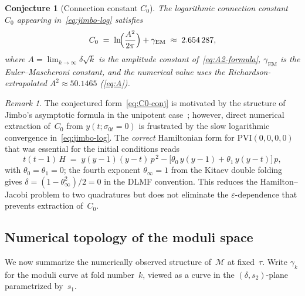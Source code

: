 \documentclass[11pt,a4paper]{article}
\theoremstyle{plain}
\newtheorem{conjecture}[theorem]{Conjecture}
\theoremstyle{definition}
\theoremstyle{remark}
\newtheorem{remark}[theorem]{Remark}
\begin{document}
\begin{conjecture}[Connection constant $C_0$]
\label{conj:C0}
The logarithmic connection constant~$C_0$ appearing
in~\eqref{eq:jimbo-log} satisfies
\begin{equation}\label{eq:C0-conj}
  C_0 \;=\; \ln\!\Bigl(\frac{A^2}{2\pi}\Bigr) + \gamma_{\mathrm{EM}}
  \;\approx\; 2.654\,287,
\end{equation}
where $A = \lim_{k\to\infty}\delta\sqrt{k}$ is the amplitude
constant of~\cref{eq:A2-formula},
$\gamma_{\mathrm{EM}}$ is the Euler--Mascheroni constant,
and the numerical value uses the Richardson-extrapolated
$A^2 \approx 50.1465$ (\cref{eq:A}).
\end{conjecture}

\begin{remark}
The conjectured form~\eqref{eq:C0-conj} is motivated by the
structure of Jimbo's asymptotic formula in the unipotent
case~\cite{Jim82}; however, direct numerical extraction of~$C_0$
from $y(t;\sigma_{0t}=0)$ is frustrated by the slow logarithmic
convergence in~\eqref{eq:jimbo-log}.
The \emph{correct} Hamiltonian form for $\mathrm{PVI}(0,0,0,0)$
that was essential for the initial conditions reads
\[
  t(t-1)\,H \;=\; y(y-1)(y-t)\,p^{\,2}
  - \bigl[\theta_0\,y(y-1) + \theta_1\,y(y-t)\bigr]\,p,
\]
with $\theta_0 = \theta_1 = 0$; the fourth exponent
$\theta_\infty = 1$ from the Kitaev double
folding~\cite{DC26} gives
$\delta = (1 - \theta_\infty^2)/2 = 0$
in the DLMF convention.  This reduces the Hamilton--Jacobi
problem to two quadratures but does not eliminate the
$\varepsilon$-dependence that prevents extraction of~$C_0$.
\end{remark}


\subsection{Numerical topology of the moduli space}%
\label{sec:moduli-topology}

We now summarize the numerically observed structure of~$\mathcal{M}$ at
fixed~$\tau$.
Write $\gamma_k$ for the moduli curve at fold number~$k$, viewed as
a curve in the $(\delta,s_2)$-plane parametrized by~$s_1$.
\end{document}
